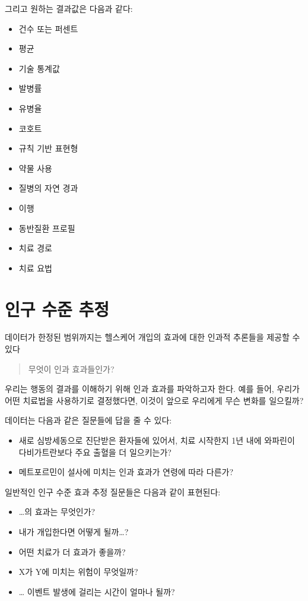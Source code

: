 \documentclass[11pt]{book}
\providecommand{\tightlist}{%
  \setlength{\itemsep}{0pt}\setlength{\parskip}{0pt}}
\theoremstyle{definition}
\theoremstyle{definition}
\theoremstyle{definition}
\theoremstyle{remark}
\begin{document}
그리고 원하는 결과값은 다음과 같다:

\begin{itemize}
\tightlist
\item
  건수 또는 퍼센트
\item
  평균
\item
  기술 통계값
\item
  발병률
\item
  유병율
\item
  코호트
\item
  규칙 기반 표현형
\item
  약물 사용
\item
  질병의 자연 경과
\item
  이행
\item
  동반질환 프로필
\item
  치료 경로
\item
  치료 요법
\end{itemize}

\section{인구 수준 추정}\label{--}


데이터가 한정된 범위까지는 헬스케어 개입의 효과에 대한 인과적 추론들을
제공할 수 있다

\begin{quote}
무엇이 인과 효과들인가?
\end{quote}

우리는 행동의 결과를 이해하기 위해 인과 효과를 파악하고자 한다. 예를
들어, 우리가 어떤 치료법을 사용하기로 결정했다면, 이것이 앞으로 우리에게
무슨 변화를 일으킬까?

데이터는 다음과 같은 질문들에 답을 줄 수 있다:

\begin{itemize}
\tightlist
\item
  새로 심방세동으로 진단받은 환자들에 있어서, 치료 시작한지 1년 내에
  와파린이 다비가트란보다 주요 출혈을 더 일으키는가?
\item
  메트포르민이 설사에 미치는 인과 효과가 연령에 따라 다른가?
\end{itemize}

일반적인 인구 수준 효과 추정 질문들은 다음과 같이 표현된다:

\begin{itemize}
\tightlist
\item
  \ldots{}의 효과는 무엇인가?
\item
  내가 개입한다면 어떻게 될까\ldots{}?
\item
  어떤 치료가 더 효과가 좋을까?
\item
  X가 Y에 미치는 위험이 무엇일까?
\item
  \ldots{} 이벤트 발생에 걸리는 시간이 얼마나 될까?
\end{itemize}
\end{document}
